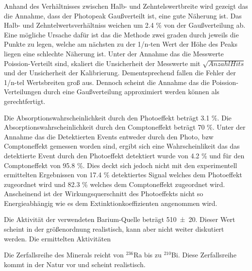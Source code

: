 Anhand des Verhältnisses zwischen Halb- und Zehntelswertbreite wird gezeigt das die Annahme, dass der Photopeak Gaußverteilt ist, eine gute Näherung ist. Das Halb- und Zehntelwertsverhältniss weichen um 2.4 \% von der Gaußverteilung ab. Eine mögliche Ursache dafür ist das die Methode zwei graden durch jeweils die Punkte zu legen, welche am nächsten zu der 1/n-ten Wert der Höhe des Peaks liegen eine schlechte Näherung ist. Unter der Annahme das die Messwerte Poission-Verteilt sind, skaliert die Unsicherheit der Messwerte mit $\sqrt{Anzahl Hits}$ und der Unsicherheit der Kalibrierung. Dementsprechend fallen die Fehler der 1/n-tel Wertsbreiten groß aus. Dennoch scheint die Annahme das die Poission-Verteilungen durch eine Gaußverteilung approximiert werden können als gerechtfertigt. 

Die Absorptionswahrscheinlichkeit durch den Photoeffekt beträgt 3.1 \%. Die Absorptionswahrscheinlichkeit durch den Comptoneffekt beträgt 70 \%. Unter der Annahme das die Detektierten Events entweder durch den Photo, bzw Comptoneffekt gemessen worden sind, ergibt sich eine Wahrscheinlikeit das das detektierte Event durch den Photoeffekt detektiert wurde von 4.2 \% und für den Comptoneffekt von 95.8 \%. Dies deckt sich jedoch nicht mit den experimentell ermittelten Ergebnissen von 17.4 \% detektiertes Signal welches dem Photoeffekt zugeordnet wird und 82.3 \% welches dem Comptoneffekt zugeordnet wird. Anscheinend ist der Wirkungsquerschnitt des Photoeffekts nicht so Energieabhängig wie es dem Extinktionkoeffizienten angenommen wird. 

Die Aktivität der verwendeten Barium-Quelle beträgt \num{510 +- 20}. Dieser Wert scheint in der größenordnung realistisch, kann aber nicht weiter diskutiert werden. Die ermittelten Aktivitäten 

Die Zerfallsreihe des Minerals reicht von $^{236}$Ra bis zu $^{210}$Bi. Diese Zerfallsreihe kommt in der Natur vor und scheint realistisch.
